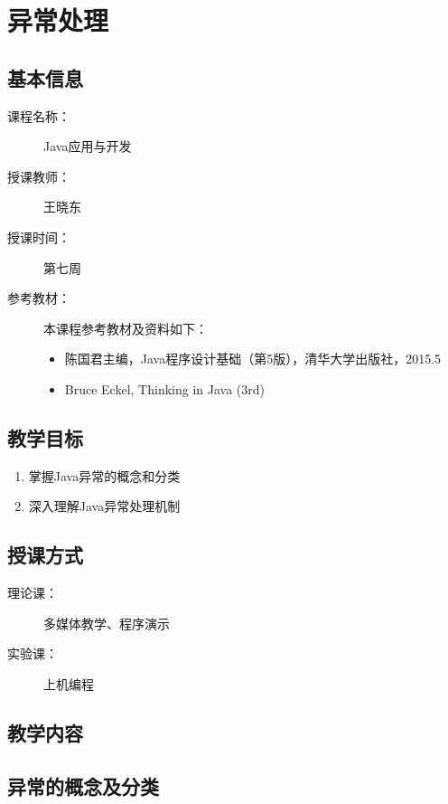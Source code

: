\chapter*{异常处理}
\label{chp:Java-exception-handling}

\section*{基本信息}
\sline
\begin{description}
\item[课程名称：] Java应用与开发
\item[授课教师：] 王晓东
\item[授课时间：] 第七周
\item[参考教材：] 本课程参考教材及资料如下：
  \begin{itemize}
  \item 陈国君主编，Java程序设计基础（第5版），清华大学出版社，2015.5
  \item Bruce Eckel, Thinking in Java (3rd)
  \end{itemize}
\end{description}

\section*{教学目标}

\sline

\begin{enumerate}
\item 掌握Java异常的概念和分类
\item 深入理解Java异常处理机制
\end{enumerate}  

\section*{授课方式}

\sline
\begin{description}
\item[理论课：] 多媒体教学、程序演示
\item[实验课：] 上机编程
\end{description}

\newpage
\section*{教学内容}
\sline

\section{异常的概念及分类}

